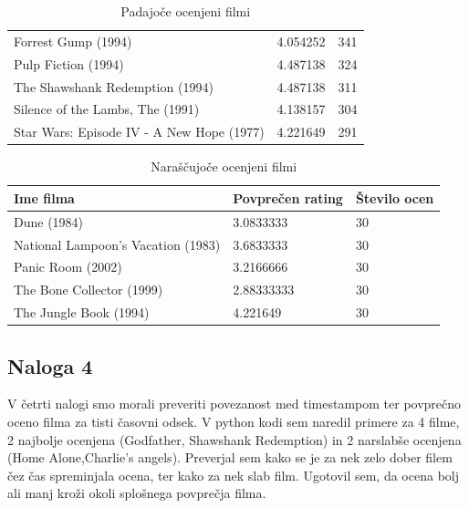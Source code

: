 \documentclass[a4paper,11pt]{article}
\begin{document}
\begin{table}[htbp]
	\caption{Padajoče ocenjeni filmi}
	\label{tab_pad}
	\begin{center}
		\begin{tabular}{llp{3cm}}
			
			\hline
			Forrest Gump (1994) 						& 4.054252 & 341 \\
			Pulp Fiction (1994)		   					& 4.487138 & 324 \\  
			The Shawshank Redemption (1994)				& 4.487138 & 311 \\
           	Silence of the Lambs, The (1991)			& 4.138157 & 304 \\
			Star Wars: Episode IV - A New Hope (1977)	& 4.221649 & 291 \\
			\hline
		\end{tabular}
	\end{center}
\end{table}

\begin{table}[htbp]
	\caption{Naraščujoče ocenjeni filmi}
	\label{tab_nar}
	\begin{center}
		\begin{tabular}{llp{3cm}}
			\hline
			Ime filma & Povprečen rating & Število ocen \\
			\hline
			Dune (1984)			 				& 3.0833333  	& 30 \\
			National Lampoon's Vacation (1983)  & 3.6833333 	& 30 \\  
			Panic Room (2002)					& 3.2166666 	& 30 \\
			The Bone Collector (1999)			&2.88333333 	& 30 \\
			The Jungle Book (1994)				& 4.221649 		& 30 \\
			\hline
		\end{tabular}
	\end{center}
\end{table}
\pagebreak

\subsection{Naloga 4}
V četrti nalogi smo morali preveriti povezanost med timestampom ter povprečno oceno filma za tisti časovni odsek. V python kodi sem naredil primere za 4 filme, 2 najbolje ocenjena (Godfather, Shawshank Redemption) in 2 narslabše ocenjena (Home Alone,Charlie's angels). Preverjal sem kako se je za nek zelo dober filem čez čas spreminjala ocena, ter kako za nek slab film. Ugotovil sem, da ocena bolj ali manj kroži okoli splošnega povprečja filma.
\end{document}
